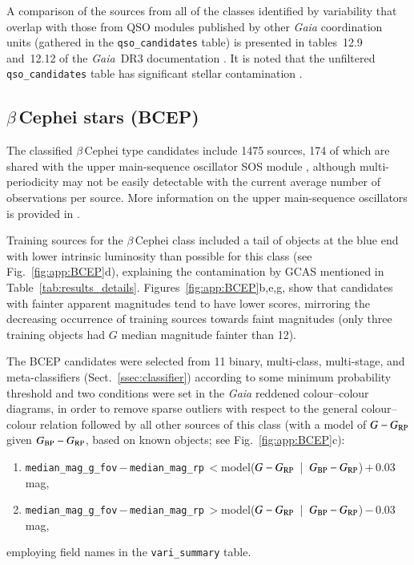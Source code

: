 \documentclass[longauth]{aa}
\def\gaia{\textit{Gaia}\xspace}
\def\gdr3{\textit{Gaia}~DR3\xspace}
\def\g{$G$\xspace}
\def\bprp{\mbox{$G_{\rm BP}-G_{\rm RP}$}\xspace}
\def\grp{\mbox{$G-G_{\rm RP}$}\xspace}
\begin{document}
A comparison of the sources from all of the classes identified by variability that overlap with those from QSO modules published by other \gaia coordination units (gathered in the \texttt{qso\_candidates} table) is presented in tables~12.9 and~12.12 of the \gdr3 documentation \citep{2022gdr3.reptE..12T}. It is noted that the unfiltered \texttt{qso\_candidates} table has significant stellar contamination \citep[estimated at 76\,\% in][where a query to select a purer  sub-sample is indicated]{DR3-DPACP-101}. 


\subsection{$\beta$\,Cephei stars (BCEP)\label{ssec:bcep}}

The classified $\beta$\,Cephei type candidates include 1475 sources, 174 of which are shared with the upper main-sequence oscillator SOS module \citep[see sect.~10.14 of the \gdr3 documentation;][]{2022gdr3.reptE..10R}, although multi-periodicity may not be easily detectable with the current average number of observations per source. More information on the upper main-sequence oscillators is provided in \citet{DR3-DPACP-79}.

Training sources for the $\beta$\,Cephei class included a tail of objects at the blue end with lower intrinsic luminosity than possible for this class (see Fig.~\ref{fig:app:BCEP}d), explaining the contamination by GCAS mentioned in Table~\ref{tab:results_details}.
Figures~\ref{fig:app:BCEP}b,e,g, show that candidates with fainter apparent magnitudes tend to have lower scores, mirroring the decreasing occurrence of training sources towards faint magnitudes (only three training objects had \g median magnitude fainter than 12).

The BCEP candidates were selected from 11 binary, multi-class, multi-stage, and meta-classifiers (Sect.~\ref{ssec:classifier}) according to some minimum probability threshold and two conditions were set in the \gaia reddened colour--colour diagrams, in order to remove sparse outliers with respect to the general colour--colour relation followed by all other sources of this class (with a model of \grp given \bprp, based on known objects; see Fig.~\ref{fig:app:BCEP}c): 
\begin{enumerate}
  \item \texttt{median\_mag\_g\_fov}\,$-$\,\texttt{median\_mag\_rp}\,$<$\break model(\grp~|~\bprp)\,$+$\,0.03\,mag,
  \item \texttt{median\_mag\_g\_fov}\,$-$\,\texttt{median\_mag\_rp}\,$>$\break model(\grp~|~\bprp)\,$-$\,0.03\,mag,
\end{enumerate}
employing field names in the \texttt{vari\_summary} table.
\end{document}
